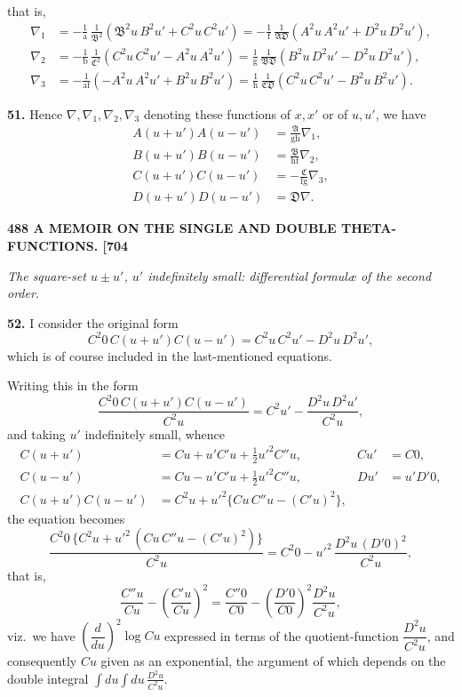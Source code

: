 \documentclass[11pt]{article}
\newcommand{\Ag}{\mathfrak{A}}
\newcommand{\Bg}{\mathfrak{B}}
\newcommand{\Cg}{\mathfrak{C}}
\newcommand{\Dg}{\mathfrak{D}}
\begin{document}
that is,
\[
\begin{aligned}
\nabla_1 &= -\tfrac{1}{\mathrm{a}}\,\tfrac{1}{\Bg^2}(\Bg^2 u\,B^2 u' + C^2 u\,C^2 u') = -\tfrac{1}{\mathrm{f}}\,\tfrac{1}{\Ag\Dg}(A^2 u\,A^2 u' + D^2 u\,D^2 u'),\\
\nabla_2 &= -\tfrac{1}{\mathrm{b}}\,\tfrac{1}{\Cg^2}(C^2 u\,C^2 u' - A^2 u\,A^2 u') = \tfrac{1}{\mathrm{g}}\,\tfrac{1}{\Bg\Dg}(B^2 u\,D^2 u' - D^2 u\,D^2 u'),\\
\nabla_3 &= -\tfrac{1}{\mathrm{a}\mathrm{f}}(-A^2 u\,A^2 u' + B^2 u\,B^2 u') = \tfrac{1}{\mathrm{h}}\,\tfrac{1}{\Cg\Dg}(C^2 u\,C^2 u' - B^2 u\,B^2 u').
\end{aligned}
\]

\medskip
\textbf{51.} Hence $\nabla,\nabla_1,\nabla_2,\nabla_3$ denoting these functions of $x,x'$ or of $u,u'$, we have
\[
\begin{aligned}
A(u+u')A(u-u') &= \tfrac{\Ag}{\mathrm{g}\mathrm{h}}\nabla_1,\\
B(u+u')B(u-u') &= \tfrac{\Bg}{\mathrm{h}\mathrm{f}}\nabla_2,\\
C(u+u')C(u-u') &= -\tfrac{\Cg}{\mathrm{f}\mathrm{g}}\nabla_3,\\
D(u+u')D(u-u') &= \Dg\nabla.
\end{aligned}
\]

\bigskip
\noindent\textbf{488 \hfill A MEMOIR ON THE SINGLE AND DOUBLE THETA-FUNCTIONS. \hfill [704}

\medskip
\begin{center}\textit{The square-set $u\pm u'$, $u'$ indefinitely small: differential formul\ae{} of the second order.}\end{center}

\textbf{52.} I consider the original form
\[
C^2 0\,C(u+u')C(u-u') = C^2 u\,C^2 u' - D^2 u\,D^2 u',
\]
which is of course included in the last-mentioned equations.

Writing this in the form
\[
\frac{C^2 0\,C(u+u')C(u-u')}{C^2 u} = C^2 u' - \frac{D^2 u\,D^2 u'}{C^2 u},
\]
and taking $u'$ indefinitely small, whence
\[
\begin{aligned}
C(u+u') &= Cu + u'C'u + \tfrac{1}{2}u'^2 C''u, & Cu' &= C0,\\
C(u-u') &= Cu - u'C'u + \tfrac{1}{2}u'^2 C''u, & Du' &= u'D'0,\\
C(u+u')C(u-u') &= C^2 u + u'^2\{Cu\,C''u - (C'u)^2\}, & &
\end{aligned}
\]
the equation becomes
\[
\frac{C^2 0\,\{C^2 u + u'^2\,(Cu\,C''u - (C'u)^2)\}}{C^2 u} = C^2 0 - u'^2\,\frac{D^2 u\,(D'0)^2}{C^2 u},
\]
that is,
\[
\frac{C''u}{Cu} - \left(\frac{C'u}{Cu}\right)^2 = \frac{C''0}{C0} - \left(\frac{D'0}{C0}\right)^2\!\frac{D^2 u}{C^2 u},
\]
viz.\ we have $\left(\dfrac{d}{du}\right)^2\log Cu$ expressed in terms of the quotient-function $\dfrac{D^2 u}{C^2 u}$, and consequently $Cu$ given as an exponential, the argument of which depends on the double integral $\displaystyle\int du \int du\,\frac{D^2 u}{C^2 u}$.
\end{document}

